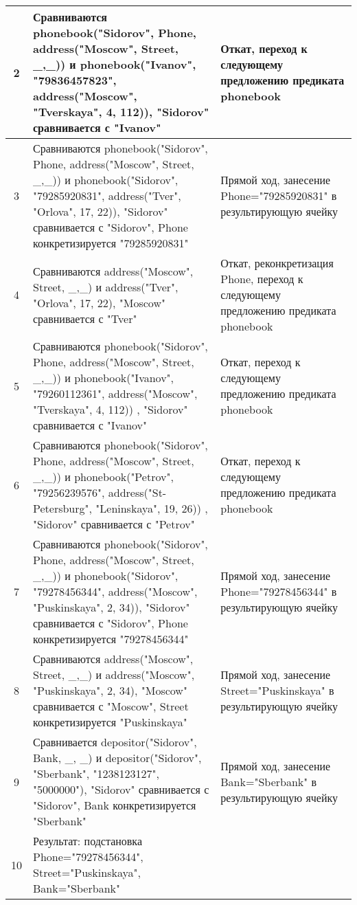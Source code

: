 \documentclass[a4paper,12pt]{article}
\begin{document}
	\begin{table}[ht!] 
		\begin{tabularx}{\linewidth}{|c|>{\centering}X|>{\centering}X|}
			\hline
			2 & Сравниваются phonebook("Sidorov"{}, Phone, address("Moscow"{}, Street, \_,\_)) и phonebook("Ivanov"{}, "79836457823"{}, address("Moscow"{}, "Tverskaya"{}, 4, 112)), "Sidorov" сравнивается с "Ivanov" & Откат, переход к следующему предложению предиката phonebook \tabularnewline
			\hline
			3 & Сравниваются phonebook("Sidorov"{}, Phone, address("Moscow"{}, Street, \_,\_)) и phonebook("Sidorov"{}, "79285920831"{}, address("Tver"{}, "Orlova"{}, 17, 22)), "Sidorov" сравнивается с "Sidorov"{}, Phone конкретизируется  "79285920831" & Прямой ход, занесение Phone="79285920831" в результирующую ячейку \tabularnewline
			\hline
			4  & Сравниваются address("Moscow"{}, Street, \_,\_)  и address("Tver"{}, "Orlova"{}, 17, 22), "Moscow" сравнивается с "Tver" & Откат, реконкретизация Phone, переход к следующему предложению предиката phonebook \tabularnewline
			\hline
			5 & Сравниваются phonebook("Sidorov"{}, Phone, address("Moscow"{}, Street, \_,\_)) и phonebook("Ivanov"{}, "79260112361"{}, address("Moscow"{}, "Tverskaya"{}, 4, 112)) , "Sidorov" сравнивается с "Ivanov" & Откат, переход к следующему предложению предиката phonebook \tabularnewline
			\hline
			6 & Сравниваются phonebook("Sidorov"{}, Phone, address("Moscow"{}, Street, \_,\_)) и phonebook("Petrov"{}, "79256239576"{}, address("St-Petersburg"{}, "Leninskaya"{}, 19, 26)) , "Sidorov" сравнивается с "Petrov" & Откат, переход к следующему предложению предиката phonebook \tabularnewline
			\hline
			7 & Сравниваются phonebook("Sidorov"{}, Phone, address("Moscow"{}, Street, \_,\_)) и phonebook("Sidorov"{}, "79278456344"{}, address("Moscow"{}, "Puskinskaya"{}, 2, 34)), "Sidorov" сравнивается с "Sidorov"{}, Phone конкретизируется "79278456344" & Прямой ход, занесение Phone="79278456344" в результирующую ячейку \tabularnewline
			\hline
			8  & Сравниваются address("Moscow"{}, Street, \_,\_)  и address("Moscow"{}, "Puskinskaya"{}, 2, 34), "Moscow" сравнивается с "Moscow"{}, Street конкретизируется "Puskinskaya"  & Прямой ход, занесение  Street="Puskinskaya" в результирующую ячейку \tabularnewline
			\hline
			9 & Сравнивается depositor("Sidorov"{}, Bank, \_, \_) и depositor("Sidorov"{}, "Sberbank"{}, "1238123127"{}, "5000000"), "Sidorov" сравнивается с "Sidorov"{}, Bank конкретизируется "Sberbank" & Прямой ход, занесение Bank="Sberbank" в результирующую ячейку\tabularnewline
			\hline
			10 & Результат: подстановка Phone="79278456344"{}, Street="Puskinskaya"{}, Bank="Sberbank" & \tabularnewline
			\hline
		\end{tabularx}
	\end{table}	
	
\end{document}

